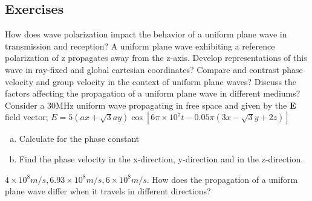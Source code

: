 \begin{mdframed}[backgroundcolor=lightblue, linewidth=1pt,  hidealllines=true]
\section{Exercises}
\begin{ExerciseList}
\Exercise[label={ex291}] How does wave polarization impact the behavior of a uniform plane wave in transmission and reception?
\Exercise[label={ex292}] A uniform plane wave exhibiting a reference polarization of z propagates away from the z-axis. Develop representations of this wave in ray-fixed and global cartesian coordinates?
\Exercise[label={ex293}] Compare and contrast phase velocity and group velocity in the context of uniform plane waves?
\Exercise[label={ex294}] Discuss the factors affecting the propagation of a uniform plane wave in different mediums?
Consider a 30MHz uniform wave propagating in free space and given by the \textbf{E} field vector;
$E = 5(a x + \sqrt{3} a y) \cos\left[6\pi \times 10^7 t - 0.05\pi(3x - \sqrt{3}y + 2z)\right]$
\begin{enumerate}[(a)]
\item Calculate for the phase constant 
\item Find the phase velocity in the x-direction, y-direction and in the z-direction.
\end{enumerate}
\Answer[ref={ex294}]
$4\times10^8 m/s,  6.93\times10^8 m/s,  6\times10^8 m/s.$
\Exercise[label={ex295}] How does the propagation of a uniform plane wave differ when it travels in different directions?
\end{ExerciseList}
\end{mdframed}
